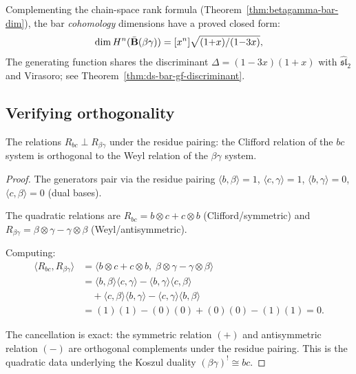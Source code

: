 \begin{remark}\label{rem:betagamma-bar-cohomology-gf}
Complementing the chain-space rank formula (Theorem~\ref{thm:betagamma-bar-dim}),
the bar \emph{cohomology} dimensions have a proved closed form:
\[
\dim H^n(\bar{\mathbf{B}}(\beta\gamma))
= [x^n]\sqrt{(1{+}x)/(1{-}3x)},
\]
The generating function shares the discriminant
$\Delta = (1{-}3x)(1{+}x)$
with $\widehat{\mathfrak{sl}}_2$ and Virasoro;
see Theorem~\ref{thm:ds-bar-gf-discriminant}.
\end{remark}
 
\subsection{Verifying orthogonality}
 
\begin{proposition}\label{prop:bc-betagamma-orthogonality}
The relations $R_{bc} \perp R_{\beta\gamma}$ under the residue pairing: the Clifford relation of the $bc$ system is orthogonal to the Weyl relation of the $\beta\gamma$ system.
\end{proposition}

\begin{proof}
The generators pair via the residue pairing $\langle b, \beta \rangle = 1$, $\langle c, \gamma \rangle = 1$, $\langle b, \gamma \rangle = 0$, $\langle c, \beta \rangle = 0$ (dual bases).

The quadratic relations are $R_{bc} = b \otimes c + c \otimes b$ (Clifford/symmetric) and $R_{\beta\gamma} = \beta \otimes \gamma - \gamma \otimes \beta$ (Weyl/antisymmetric).

Computing:
\begin{align*}
\langle R_{bc}, R_{\beta\gamma} \rangle &= \langle b \otimes c + c \otimes b, \; \beta \otimes \gamma - \gamma \otimes \beta \rangle \\
&= \langle b, \beta \rangle \langle c, \gamma \rangle - \langle b, \gamma \rangle \langle c, \beta \rangle \\
&\quad + \langle c, \beta \rangle \langle b, \gamma \rangle - \langle c, \gamma \rangle \langle b, \beta \rangle \\
&= (1)(1) - (0)(0) + (0)(0) - (1)(1) = 0.
\end{align*}

The cancellation is exact: the symmetric relation $(+)$ and antisymmetric relation $(-)$ are orthogonal complements under the residue pairing.  This is the quadratic data underlying the Koszul duality $(\beta\gamma)^! \cong bc$.
\end{proof}
 
